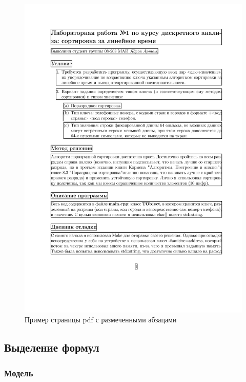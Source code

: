 \begin{figure}
    \includegraphics[scale=0.65]{img/paragraph/pdf_output.jpg}
    \caption{Пример страницы pdf с размеченными абзацами}
    \label{segmentation_pdf_output}
\end{figure}

\subsection{Выделение формул}
\subsubsection{Модель}

